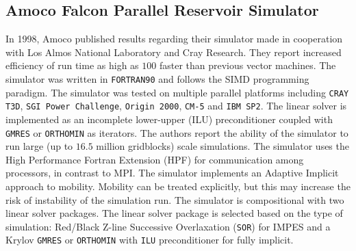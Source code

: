 \documentclass[barcolor=BrickRed,nocopyright,nolists]{asmejour}
\begin{document}
\subsection{Amoco Falcon Parallel Reservoir Simulator}
In 1998, Amoco published results regarding their simulator made in cooperation with Los Almos National Laboratory and Cray Research\cite{spe51969}. They report increased efficiency of run time as high as $100$ faster than previous vector machines. The simulator was written in \texttt{FORTRAN90} and follows the SIMD programming paradigm.
The simulator was tested on multiple parallel platforms including \texttt{CRAY T3D}, \texttt{SGI Power Challenge}, \texttt{Origin 2000}, \texttt{CM-5} and \texttt{IBM SP2}. The linear solver is implemented as an incomplete lower-upper (ILU) preconditioner coupled with \texttt{GMRES} or \texttt{ORTHOMIN} as iterators.
The authors report the ability of the simulator to run large (up to $16.5$ million gridblocks) scale simulations. The simulator uses the High Performance Fortran Extension (HPF) for communication among processors, in contrast to MPI. The simulator implements an Adaptive Implicit approach to mobility. Mobility can be treated explicitly,
but this may increase the risk of instability of the simulation run. The simulator is compositional with two linear solver packages. The linear solver package is selected based on the type of simulation: Red/Black Z-line Successive Overlaxation (\texttt{SOR}) for IMPES and a Krylov \texttt{GMRES} or \texttt{ORTHOMIN} with \texttt{ILU} preconditioner for fully implicit.
\end{document}
